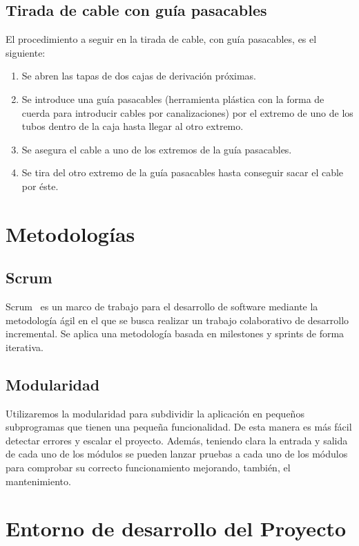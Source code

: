 \subsection{Tirada de cable con guía pasacables}\label{4:guiaPasacables}
El procedimiento a seguir en la tirada de cable, con guía pasacables, es el siguiente:
\begin{enumerate}
        \item Se abren las tapas de dos cajas de derivación próximas.
        \item Se introduce una guía pasacables (herramienta plástica con la forma de cuerda para introducir cables por canalizaciones) por el extremo de uno de los tubos dentro de la caja hasta llegar al otro extremo.
        \item Se asegura el cable a uno de los extremos de la guía pasacables.
        \item Se tira del otro extremo de la guía pasacables hasta conseguir sacar el cable por éste.
\end{enumerate}

\section{Metodologías}
\subsection{Scrum}\label{4:SCRUM}
Scrum~\cite{manual:Scrum} es un marco de trabajo para el desarrollo de software mediante la metodología ágil en el que se busca realizar un trabajo colaborativo de desarrollo incremental. Se aplica una metodología basada en milestones y sprints de forma iterativa.

\subsection{Modularidad}\label{4:Modularidad}
Utilizaremos la modularidad para subdividir la aplicación en pequeños subprogramas que tienen una pequeña funcionalidad. De esta manera es más fácil detectar errores y escalar el proyecto. Además, teniendo clara la entrada y salida de cada uno de los módulos se pueden lanzar pruebas a cada uno de los módulos para comprobar su correcto funcionamiento mejorando, también, el mantenimiento.

\section{Entorno de desarrollo del Proyecto}

